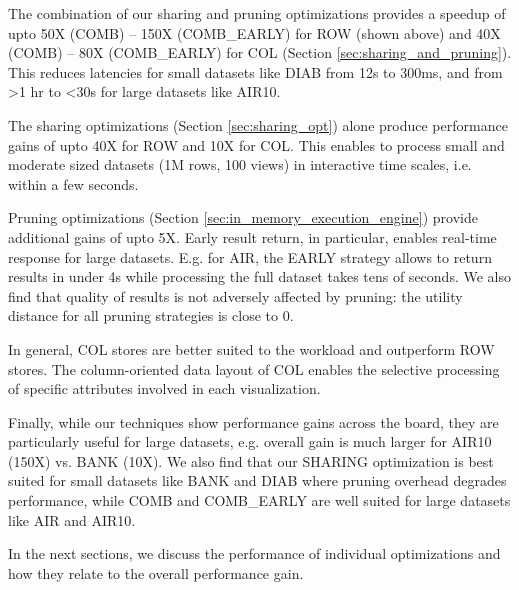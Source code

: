 \begin{denselist} 
\item The combination of our sharing and pruning optimizations provides a speedup of upto 50X (COMB) -- 150X (COMB\_EARLY) for ROW (shown above) and 40X (COMB) -- 80X (COMB\_EARLY) for COL (Section \ref{sec:sharing_and_pruning}).
This reduces latencies for small datasets like DIAB from 12s to 300ms, and from >1 hr to <30s for large datasets like AIR10.
\item The sharing optimizations (Section \ref{sec:sharing_opt}) alone produce performance gains of upto 40X for ROW and 10X for COL. This enables \SeeDB to process small and moderate sized datasets (1M rows, 100 views) in interactive time scales, i.e. within a few seconds.
\item Pruning optimizations (Section \ref{sec:in_memory_execution_engine}) provide additional gains of upto 5X. Early result return, in particular, enables real-time response for large datasets. E.g. for AIR, the EARLY strategy allows \SeeDB to return results in under 4s while processing the full dataset takes tens of seconds. We also find that quality of results is not adversely affected by pruning: the utility distance for all pruning strategies is close to 0.
\item In general, COL stores are better suited to the \SeeDB workload and outperform ROW stores. The column-oriented data layout of COL enables the selective processing of specific attributes involved in each visualization. 
\item Finally, while our techniques show performance gains across the board, they are particularly useful for large datasets, e.g. overall gain is much larger for AIR10 (150X) vs. BANK (10X). We also find that our SHARING optimization is best suited for small datasets like BANK and DIAB where pruning overhead degrades performance, while COMB and COMB\_EARLY are well suited for large datasets like AIR and AIR10.
\end{denselist}

In the next sections, we discuss the performance of individual optimizations and how they relate to the overall performance gain.



